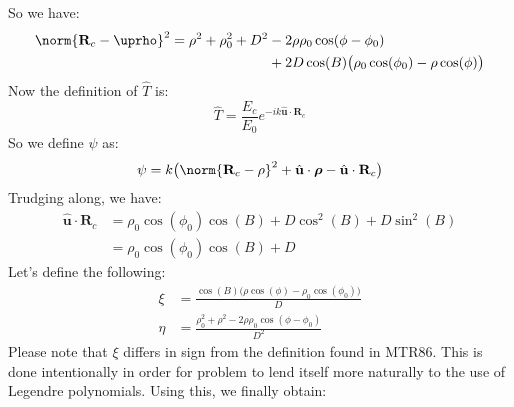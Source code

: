 \documentclass[crop=false,class=book,oneside]{standalone}
\begin{document}
            So we have:
            \begin{equation}
                \begin{split}
                    \norm{\mathbf{R}_{c}-\boldsymbol{\uprho}}^{2}
                    =\rho^{2}+\rho_{0}^{2}+D^{2}&-
                    2\rho\rho_{0}\cos(\phi-\phi_{0})
                    \\&+2D\cos(B)\big(\rho_{0}\cos(\phi_0)-
                    \rho\cos(\phi)\big)
                \end{split}
            \end{equation}
            Now the definition of $\hat{T}$ is:
            \begin{equation}
                \hat{T}=\frac{E_{c}}{E_{0}}
                e^{-ik\hat{\mathbf{u}}\cdot\mathbf{R}_{c}}
            \end{equation}
            So we define $\psi$ as:
            \begin{equation}
                \psi=
                k\big(\norm{\mathbf{R}_{c}-\rho}^{2}+
                      \hat{\mathbf{u}}\cdot\boldsymbol{\rho}-
                      \hat{\mathbf{u}}\cdot\mathbf{R}_{c}\big)
            \end{equation}
            Trudging along, we have:
            \begin{subequations}
                \begin{align}
                    \hat{\mathbf{u}}\cdot\mathbf{R}_{c}
                    &=\rho_{0}\cos(\phi_0)\cos(B)+
                    D\cos^{2}(B)+D\sin^2(B)\\
                    &=\rho_{0}\cos(\phi_{0})\cos(B)+D    
                \end{align}
            \end{subequations}
            Let's define the following:
            \begin{align}
                \xi&=\frac{\cos(B)\big(\rho\cos(\phi)-
                           \rho_{0}\cos(\phi_{0})\big)}
                          {D}\\
                \eta&=\frac{\rho_{0}^2+\rho^2-
                            2\rho\rho_{0}\cos(\phi-\phi_{0})}
                           {D^{2}}
            \end{align}
            Please note that $\xi$ differs in sign from
            the definition found in MTR86. This is done
            intentionally in order for problem to lend
            itself more naturally to the use of
            Legendre polynomials.
            Using this, we finally obtain:
\end{document}
